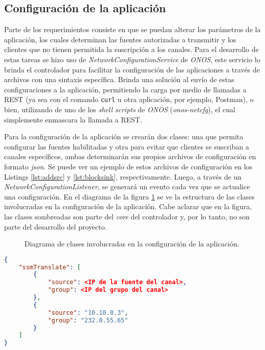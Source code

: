 \subsection{Configuración de la aplicación}
Parte de los requerimientos consiste en que se puedan alterar los parámetros de la aplicación, los cuales determinan las fuentes autorizadas a transmitir y los clientes que no tienen permitida la suscripción a los canales. Para el desarrollo de estas tareas se hizo uso de \textit{NetworkConfigurationService} \parencite{onosnetcfg} de \textit{ONOS}, este servicio lo brinda el controlador para facilitar la configuración de las aplicaciones a través de archivos con una sintaxis específica. Brinda una solución al envío de estas configuraciones a la aplicación, permitiendo la carga por medio de llamadas a REST (ya sea con el comando \texttt{curl} \parencite{curlman} u otra aplicación, por ejemplo, Postman\parencite{postman}), o bien, utilizando de uno de los \textit{shell scripts} de \textit{ONOS} (\textit{onos-netcfg}), el cual simplemente enmascara la llamada a REST.

Para la configuración de la aplicación se crearán dos clases: una que permita configurar las fuentes habilitadas y otra para evitar que clientes se suscriban a canales específicos, ambas determinarán sus propios archivos de configuración en formato \textit{json}. Se puede ver un ejemplo de estos archivos de configuración en los Listings \ref{lst:addsrc} y \ref{lst:blocksink}, respectivamente. Luego, a través de un \textit{NetworkConfigurationListener}, se generará un evento cada vez que se actualice una configuración. En el diagrama de la figura \ref{fig:configclasses} se ve la estructura de las clases involucradas en la configuración de la aplicación. Cabe aclarar que en la figura, las clases sombreadas son parte del \textit{core} del controlador y, por lo tanto, no son parte del desarrollo del proyecto.

\begin{figure}[th]
	\centering 
	\caption[Diagrama de clases involucradas en la configuración de la aplicación]{Diagrama de clases involucradas en la configuración de la aplicación.}
	\label{fig:configclasses}
\end{figure}


\begin{lstlisting}[language=json, caption={Ejemplo de configuración de habilitación de canales de transmisión}, captionpos=b, label={lst:addsrc}]
{
    "ssmTranslate": [
        {
            "source": <IP de la fuente del canal>,
            "group": <IP del grupo del canal>
        },
        {
            "source": "10.10.0.3",
            "group": "232.0.55.65"
        }
    ]
}

\end{lstlisting}

